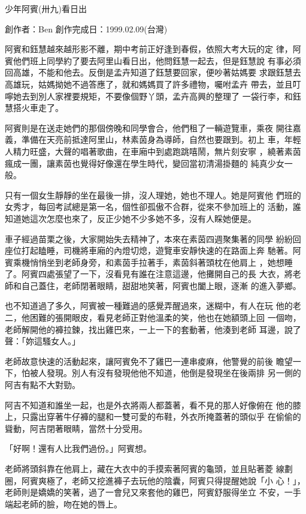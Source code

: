 



少年阿賓(卅九)看日出

創作者：Ben
創作完成日：1999.02.09(台灣)


阿賓和鈺慧越來越形影不離，期中考前正好逢到春假，依照大考大玩的定
律，阿賓他們班上同學約了要去阿里山看日出，他問鈺慧一起去，但是鈺慧說
有事必須回高雄，不能和他去。反倒是孟卉知道了鈺慧要回家，便吵著姑媽要
求跟鈺慧去高雄玩，姑媽拗她不過答應了，就和媽媽買了許多禮物，囑咐孟卉
帶去，並且叮嚀她去到別人家裡要規矩，不要像個野丫頭，孟卉高興的整理了
一袋行李，和鈺慧搭火車走了。

阿賓則是在送走她們的那個傍晚和同學會合，他們租了一輛遊覽車，乘夜
開往嘉義，準備在天亮前抵達阿里山，林素茵身為導師，自然也要跟到。初上
車，年輕人精力旺盛，大聲的唱著歌曲，在車廂中到處跑跳嘻鬧，無片刻安寧
，繞著素茵瘋成一團，讓素茵也覺得好像還在學生時代，變回當初清湯掛麵的
純真少女一般。

只有一個女生靜靜的坐在最後一排，沒人理她，她也不理人。她是阿賓他
們班的女秀才，每回考試總是第一名，個性卻孤傲不合群，從來不參加班上的
活動，誰知道她這次怎麼也來了，反正少她不少多她不多，沒有人睬她便是。

車子經過苗栗之後，大家開始失去精神了，本來在素茵四週聚集著的同學
紛紛回座位打起瞌睡，司機將車廂的內燈切熄，遊覽車安靜快速的在路面上奔
馳著。阿賓乘機悄悄坐到老師身旁，和素茵手拉著手，素茵斜著頭枕在他肩上
，她想睡了。阿賓四處張望了一下，沒看見有誰在注意這邊，他攤開自己的長
大衣，將老師和自己蓋住，老師閉著眼睛，甜甜地笑著，阿賓也闔上眼，逐漸
的進入夢鄉。

也不知道過了多久，阿賓被一種難過的感覺弄醒過來，迷糊中，有人在玩
他的老二，他困難的張開眼皮，看見老師正對他溫柔的笑，他也在她額頭上回
一個吻，老師解開他的褲拉鍊，找出雞巴來，一上一下的套動著，他湊到老師
耳邊，說了聲：「妳這騷女人。」

老師故意快速的活動起來，讓阿賓免不了雞巴一連串痠麻，他警覺的前後
瞻望一下，怕被人發現。別人有沒有發現他他不知道，他倒是發現坐在後兩排
另一側的阿吉有點不大對勁。

阿吉不知道和誰坐一起，也是外衣將兩人都蓋著，看不見的那人好像俯在
他的膝上，只露出穿著牛仔褲的腿和一雙可愛的布鞋，外衣所掩蓋著的頭似乎
在偷偷的聳動，阿吉閉著眼睛，當然十分受用。

「好啊！還有人比我們過份。」阿賓想。

老師將頭斜靠在他肩上，藏在大衣中的手摸索著阿賓的龜頭，並且貼著菱
線劃圈，阿賓爽極了，老師又挖進褲子去玩他的陰囊，阿賓只得提醒她說「小
心！」，老師則是嬌嬌的笑著，過了一會兒又來套他的雞巴，阿賓舒服得坐立
不安，一手端起老師的臉，吻在她的唇上。


